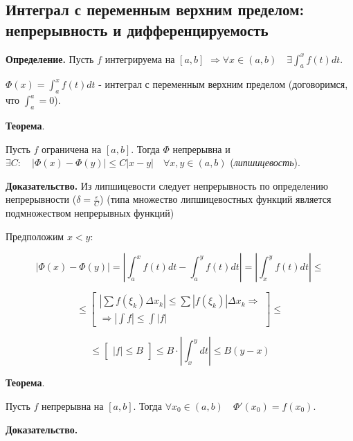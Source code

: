 \documentclass[a4paper]{article}
\begin{document}
\begin{definit}
\hypertarget{p12}{}
\subsection*{Интеграл с переменным верхним пределом: непрерывность и дифференцируемость}

\textbf{Определение.} Пусть $f$ интегрируема на $[a,b]$ $\Rightarrow \forall x \in (a,b) \quad \exists \int_a^x f(t)dt$.

$\Phi(x) = \int_a^x f(t)dt$ - интеграл с переменным верхним пределом (договоримся, что $\int_a^a = 0$).

\begin{htheorem}\textbf{Теорема}.

Пусть $f$ ограничена на $[a,b]$. Тогда $\Phi$ непрерывна и \\ $\exists C: \quad |\Phi(x) - \Phi(y)| \leq C|x-y| \quad \forall x, y \in (a,b)$ (\textit{липшицевость}).
\end{htheorem}

\begin{hproof}\textbf{Доказательство.}
Из липшицевости следует непрерывность по определению непрерывности ($\delta = \frac{\varepsilon}{C}$) (типа множество липшицевостных функций является подмножеством непрерывных функций)


Предположим $x<y$:

\[
	|\Phi(x) - \Phi(y)| = \left| \int_a^x f(t)dt - \int_a^y f(t) dt \right| = \left| \int_x^y f(t)dt \right| \leq 
\]

\[\leq \begin{bmatrix}
	\left| \sum f(\xi_k) \Delta x_k \right| \leq \sum \left| f(\xi_k) \right| \Delta x_k \Rightarrow \\
	\Rightarrow \left| \int f \right| \leq \int |f|
	\end{bmatrix} \leq
\]
 
\[ \leq
 \begin{bmatrix}
 |f| \leq B
 \end{bmatrix} \leq B \cdot \left| \int_x^y dt \right| \leq B(y-x)
\]
\end{hproof}

\begin{htheorem}\textbf{Теорема}.

Пусть $f$ непрерывна на $[a,b]$. Тогда $\forall x_0 \in (a,b) \quad \Phi'(x_0) = f(x_0)$.
\end{htheorem}

\begin{hproof}\textbf{Доказательство.}


\end{hproof}
\end{definit}
\end{document}
